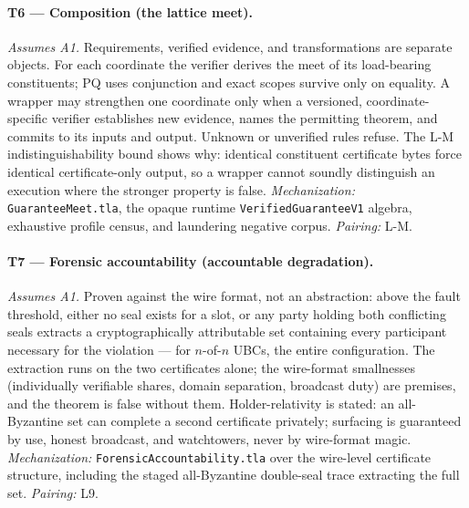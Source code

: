 \documentclass[11pt]{article}
\newcommand{\code}[1]{\texttt{#1}}
\begin{document}
\paragraph{T6 --- Composition (the lattice meet).}
\textit{Assumes A1.} Requirements, verified evidence, and transformations are
separate objects. For each coordinate the verifier derives the meet of its
load-bearing constituents; PQ uses conjunction and exact scopes survive only
on equality. A wrapper may strengthen one coordinate only when a versioned,
coordinate-specific verifier establishes new evidence, names the permitting
theorem, and commits to its inputs and output. Unknown or unverified rules
refuse. The L-M indistinguishability bound shows why: identical constituent
certificate bytes force identical certificate-only output, so a wrapper
cannot soundly distinguish an execution where the stronger property is false.
\textit{Mechanization:} \code{GuaranteeMeet.tla}, the opaque runtime
\code{VerifiedGuaranteeV1} algebra, exhaustive profile census, and laundering
negative corpus. \textit{Pairing:} L-M.

\paragraph{T7 --- Forensic accountability (accountable degradation).}
\textit{Assumes A1.} Proven against the wire format, not an abstraction:
above the fault threshold, either no seal exists for a slot, or any party
holding both conflicting seals extracts a cryptographically attributable
set containing every participant necessary for the violation --- for
\(n\)-of-\(n\) UBCs, the entire configuration. The extraction runs on the
two certificates alone; the wire-format smallnesses (individually
verifiable shares, domain separation, broadcast duty) are premises, and
the theorem is false without them. Holder-relativity is stated: an
all-Byzantine set can complete a second certificate privately; surfacing
is guaranteed by use, honest broadcast, and watchtowers, never by
wire-format magic.
\textit{Mechanization:} \code{ForensicAccountability.tla} over the
wire-level certificate structure, including the staged all-Byzantine
double-seal trace extracting the full set. \textit{Pairing:} L9.
\end{document}
